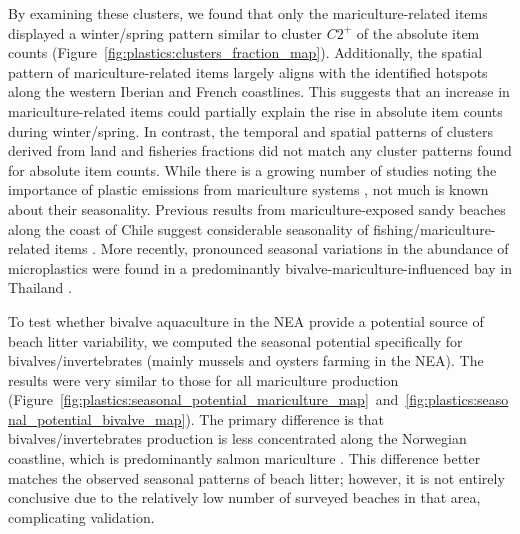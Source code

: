 By examining these clusters, we found that only the mariculture-related items displayed a winter/spring pattern similar to cluster $C2^{+}$ of the absolute item counts (Figure~\ref{fig:plastics:clusters_fraction_map}). Additionally, the spatial pattern of mariculture-related items largely aligns with the identified hotspots along the western Iberian and French coastlines. This suggests that an increase in mariculture-related items could partially explain the rise in absolute item counts during winter/spring. In contrast, the temporal and spatial patterns of clusters derived from land and fisheries fractions did not match any cluster patterns found for absolute item counts. While there is a growing number of studies noting the importance of plastic emissions from mariculture systems \cite{kruger_plastic_2020,tian_can_2022,skirtun_plastic_2022}, not much is known about their seasonality. Previous results from mariculture-exposed sandy beaches along the coast of Chile suggest considerable seasonality of fishing/mariculture-related items \cite{thiel_anthropogenic_2013}. More recently, pronounced seasonal variations in the abundance of microplastics were found in a predominantly bivalve-mariculture-influenced bay in Thailand \cite{ruangpanupan_seasonal_2023}.


To test whether bivalve aquaculture in the NEA provide a potential source of beach litter variability, we computed the seasonal potential specifically for bivalves/invertebrates (mainly mussels and oysters farming in the NEA). The results were very similar to those for all mariculture production (Figure~\ref{fig:plastics:seasonal_potential_mariculture_map}~and~\ref{fig:plastics:seasonal_potential_bivalve_map}). The primary difference is that bivalves/invertebrates production is less concentrated along the Norwegian coastline, which is predominantly salmon mariculture \cite{fao_state_2022}. This difference better matches the observed seasonal patterns of beach litter; however, it is not entirely conclusive due to the relatively low number of surveyed beaches in that area, complicating validation.




